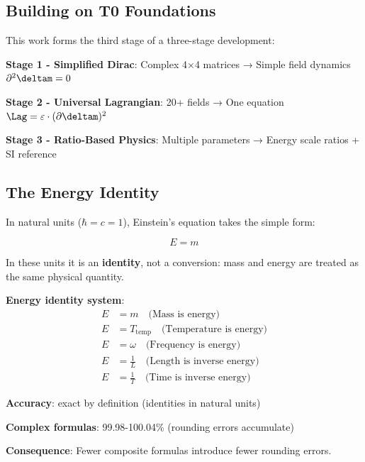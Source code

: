 	\subsection{Building on T0 Foundations}
	
	This work forms the third stage of a three-stage development:
	
	\textbf{Stage 1 - Simplified Dirac}: Complex 4×4 matrices → Simple field dynamics $\partial^2 \deltam = 0$
	
	\textbf{Stage 2 - Universal Lagrangian}: 20+ fields → One equation $\Lag = \varepsilon \cdot (\partial \deltam)^2$
	
	\textbf{Stage 3 - Ratio-Based Physics}: Multiple parameters → Energy scale ratios + SI reference
	
	\subsection{The Energy Identity}
	
	In natural units ($\hbar = c = 1$), Einstein's equation takes the simple form:
	
	\begin{equation}
		\boxed{E = m}
		\label{eq:energy_mass_identity}
	\end{equation}
	
	In these units it is an \textbf{identity}, not a conversion: mass and energy are treated as the same physical quantity.
	
	\begin{tcolorbox}[colback=blue!5!white,colframe=blue!75!black,title=Universal Energy Relationships]
		\textbf{Energy identity system}:
		\begin{align}
			E &= m \quad \text{(Mass is energy)} \\
			E &= T_{\text{temp}} \quad \text{(Temperature is energy)} \\
			E &= \omega \quad \text{(Frequency is energy)} \\
			E &= \frac{1}{L} \quad \text{(Length is inverse energy)} \\
			E &= \frac{1}{T} \quad \text{(Time is inverse energy)}
		\end{align}
		
		\textbf{Accuracy}: exact by definition (identities in natural units)
		
		\textbf{Complex formulas}: 99.98-100.04\% (rounding errors accumulate)
		
		\textbf{Consequence}: Fewer composite formulas introduce fewer rounding errors.
	\end{tcolorbox}
	
